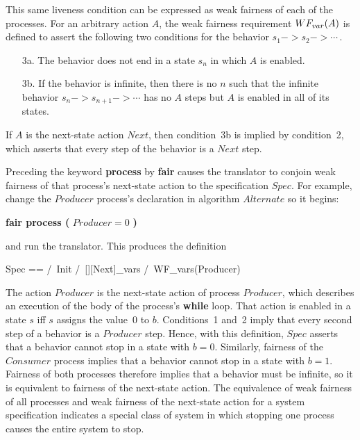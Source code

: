 \documentclass[fleqn,leqno]{article}
\begin{document}
This same liveness condition can be expressed as weak fairness of each
of the processes.  For an arbitrary action $A$, the 
weak fairness requirement 
$\WF_{var}(A)$ is defined to assert the following
two conditions for the behavior $s_{1}-> s_{2} -> \cdots$\,.
\begin{enumerate}
\item[3a.] The behavior does not end in a state $s_{n}$ in which
$A$ is enabled.

\item[3b.] If the behavior is infinite, then there is no $n$ such
that the infinite behavior $s_{n}->s_{n+1}-> \cdots$ has no $A$ steps
but $A$ is enabled in all of its states.
\end{enumerate}
If $A$ is the next-state action $Next$, then condition~3b is implied
by condition~2, which asserts that every step of the behavior is a
$Next$ step.

Preceding the keyword 
\textbf{process} by \textbf{fair} causes the
translator to conjoin weak fairness of that process's next-state
action to the specification $Spec$.  For example, change the
$Producer$ process's declaration in algorithm $Alternate$ so it begins:
\begin{display}
\textbf{fair process (} $Producer = 0$ \textbf{)}
\end{display}
and run the translator.  This produces the definition
\begin{display}
\begin{notla}
Spec == /\ Init /\ [][Next]_vars
        /\ WF_vars(Producer)
\end{notla}
\begin{tlatex}
%
%
\end{tlatex}
\end{display}
The action $Producer$ is the next-state action of process $Producer$,
which describes an execution of the body of the process's
\textbf{while} loop.  That action is enabled in a state $s$ iff $s$
assigns the value~0 to $b$.  Conditions~1 and~2 imply that every
second step of a behavior is a $Producer$ step.  Hence, with this
definition, $Spec$ asserts that a behavior cannot stop in a state with
$b=0$.  Similarly, fairness of the $Consumer$ process implies that a
behavior cannot stop in a state with $b=1$.  Fairness of both
processes therefore implies that a behavior must be infinite, so it is
equivalent to fairness of the next-state action.  The equivalence of
weak fairness of all processes and weak fairness of the next-state
action for a system specification indicates a special class of system
in which stopping one process causes the entire system to stop.
\end{document}
